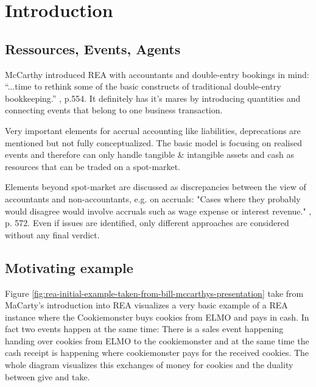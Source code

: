 \chapter{Introduction}\label{chap01}

\section{Ressources, Events, Agents}\label{sec:REAIntroduction}

McCarthy introduced REA with accountants and double-entry bookings in mind: “...time to rethink some of the basic constructs of traditional double-entry bookkeeping.” \cite{mccarthy1982rea}, p.554.
It definitely has it's mares by introducing quantities and connecting events that belong to one business transaction.

Very important elements for accrual accounting like liabilities, deprecations are mentioned but not fully conceptualized.
The basic model is focusing on realised events and therefore can only handle tangible \& intangible assets and cash as resources that can be traded on a spot-market.

Elements beyond spot-market are discussed as discrepancies between the view of accountants and non-accountants, e.g. on accruals:
"Cases where they probably would disagree would involve accruals such as wage expense or interest revenue." \cite{mccarthy1982rea}, p. 572.
Even if issues are identified, only different approaches are considered without any final verdict.

\section{Motivating example}\label{sec:motivation}
Figure \ref{fig:rea-initial-example-taken-from-bill-mccarthys-presentation} take from MaCarty's introduction into REA \cite{mccarthy2004elmo-cookie-monster} visualizes a very basic example of a REA instance where the Cookiemonster buys cookies from ELMO and pays in cash.
In fact two events happen at the same time: There is a sales event happening handing over cookies from ELMO to the cookiemonster and at the same time the cash receipt is happening where cookiemonster pays for the received cookies.
The whole diagram visualizes this exchanges of money for cookies and the duality between give and take.

